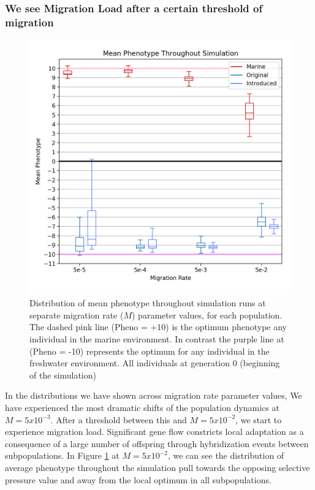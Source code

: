 \documentclass{article}
\begin{document}


\subsubsection*{We see Migration Load after a certain threshold of migration}

\begin{figure}[h!tb]
	\begin{center}
  		\includegraphics[width=0.6\linewidth]{matplotlibPlots/MeanPhenotype1.png}
  		\caption{Distribution of mean phenotype throughout simulation runs at separate migration rate ($M$) parameter values, for each population.
		The dashed pink line (Pheno = +10) is the optimum phenotype any individual in the marine environment.
		In contrast the purple line at (Pheno = -10) represents the optimum for any individual in the freshwater environment. 
		All individuals at generation 0 (beginning of the simulation) 
		}
  		\label{fig:MeanPhenotype}
	\end{center}
\end{figure}


In the distributions we have shown across migration rate parameter values, 
We have experienced the most dramatic shifts of the population dynamics at $M = 5x10^{-3}$.
After a threshold between this and $M = 5x10^{-2}$, we start to experience migration load. 
Significant gene flow constricts local adaptation
as a consequence of a large number of offspring through hybridization events between subpopulations.
In Figure \ref{fig:MeanPhenotype} at $M = 5x10^{-2}$, we can see the distribution of average phenotype throughout the simulation
pull towards the opposing selective pressure value and away from the local optimum in all subpopulations.
\end{document}
